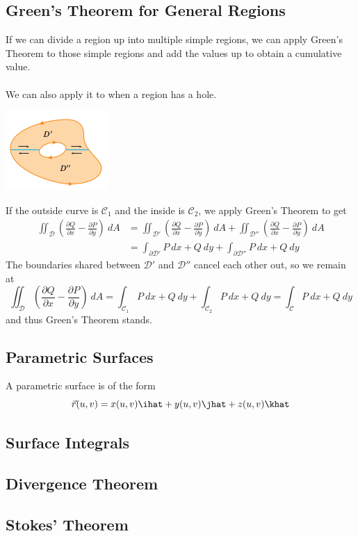 \documentclass[12pt]{article}
\begin{document}
\subsection{Green's Theorem for General Regions}
If we can divide a region up into multiple simple regions, we can apply Green's Theorem to those simple regions and add the values up to obtain a cumulative value. \\ \\
We can also apply it to when a region has a hole.
\begin{center}
\includegraphics[scale=0.4]{holes}
\end{center}
If the outside curve is $\mathcal{C}_1$ and the inside is $\mathcal{C}_2$, we apply Green's Theorem to get \[ \begin{aligned} \iint_{\mathcal{D}}\left(\frac{\partial Q}{\partial x} - \frac{\partial P}{\partial y}\right) \ dA &= \iint_{\mathcal{D}'}\left(\frac{\partial Q}{\partial x} - \frac{\partial P}{\partial y}\right) \ dA + \iint_{\mathcal{D}''}\left(\frac{\partial Q}{\partial x} - \frac{\partial P}{\partial y}\right) \ dA \\ &= \int_{\partial \mathcal{D}'}P \ dx + Q \ dy + \int_{\partial \mathcal{D}''}P \ dx + Q \ dy \end{aligned} \]
The boundaries shared between $\mathcal{D}'$ and $\mathcal{D}''$ cancel each other out, so we remain at \[  \iint_{\mathcal{D}}\left(\frac{\partial Q}{\partial x} - \frac{\partial P}{\partial y}\right) \ dA = \int_{\mathcal{C}_1}P \ dx + Q \ dy + \int_{\mathcal{C}_2}P \ dx + Q \ dy = \int_{\mathcal{C}}P \ dx + Q \ dy \]
and thus Green's Theorem stands.
\subsection{Parametric Surfaces}
A parametric surface is of the form \[ \vec{r}(u,v) = x(u,v)\ihat + y(u,v)\jhat + z(u,v)\khat \]
\subsection{Surface Integrals}


\subsection{Divergence Theorem}

\subsection{Stokes' Theorem}
\end{document}
